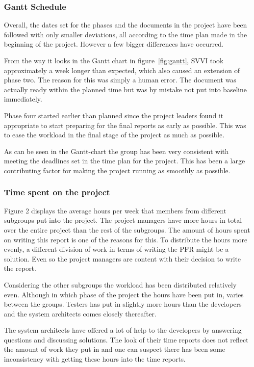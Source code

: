 \documentclass[a4paper]{article}
\begin{document}
\subsubsection{Gantt Schedule}
Overall, the dates set for the phases and the documents in the project have been followed with only smaller deviations, all according to the time plan made in the beginning of the project. However a few bigger differences have occurred.

From the way it looks in the Gantt chart in figure~\ref{fig:gantt}, SVVI took approximately a week longer than expected, which also caused an extension of phase two. The reason for this was simply a human error. The document was actually ready within the planned time but was by mistake not put into baseline immediately. 

Phase four started earlier than planned since the project leaders found it appropriate to start preparing for the final reports as early as possible. This was to ease the workload in the final stage of the project as much as possible.

As can be seen in the Gantt-chart the group has been very consistent with meeting the deadlines set in the time plan for the project. This has been a large contributing factor for making the project running as smoothly as possible.

\subsubsection{Time spent on the project}
Figure 2 displays the average hours per week that members from different subgroups put into the project. The project managers have more hours in total over the entire project than the rest of the subgroups. The amount of hours spent on writing this report is one of the reasons for this. To distribute the hours more evenly, a different division of work in terms of writing the PFR might be a solution. Even so the project managers are content with their decision to write the report. 

Considering the other subgroups the workload has been distributed relatively even. Although in which phase of the project the hours have been put in, varies between the groups. Testers has put in slightly more hours than the developers and the system architects comes closely thereafter. 

The system architects have offered a lot of help to the developers by answering questions and discussing solutions. The look of their time reports does not reflect the amount of work they put in and one can suspect there has been some inconsistency with getting these hours into the time reports.
\end{document}
